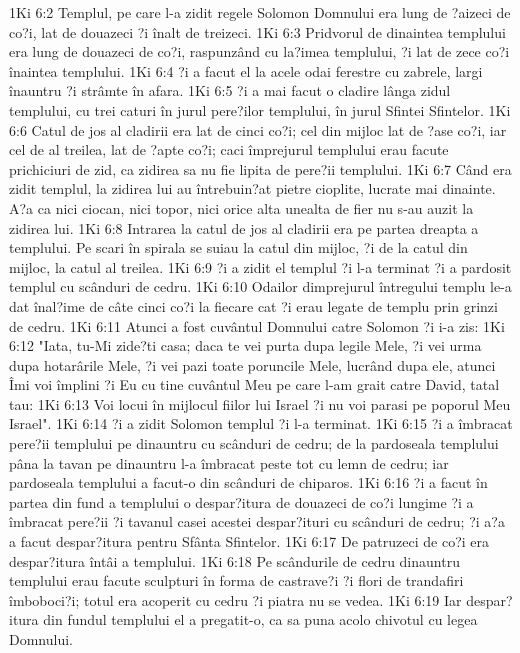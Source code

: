 1Ki 6:2  Templul, pe care l-a zidit regele Solomon Domnului era lung de ?aizeci de co?i, lat de douazeci ?i înalt de treizeci.
1Ki 6:3  Pridvorul de dinaintea templului era lung de douazeci de co?i, raspunzând cu la?imea templului, ?i lat de zece co?i înaintea templului.
1Ki 6:4  ?i a facut el la acele odai ferestre cu zabrele, largi înauntru ?i strâmte în afara.
1Ki 6:5  ?i a mai facut o cladire lânga zidul templului, cu trei caturi în jurul pere?ilor templului, în jurul Sfintei Sfintelor.
1Ki 6:6  Catul de jos al cladirii era lat de cinci co?i; cel din mijloc lat de ?ase co?i, iar cel de al treilea, lat de ?apte co?i; caci împrejurul templului erau facute prichiciuri de zid, ca zidirea sa nu fie lipita de pere?ii templului.
1Ki 6:7  Când era zidit templul, la zidirea lui au întrebuin?at pietre cioplite, lucrate mai dinainte. A?a ca nici ciocan, nici topor, nici orice alta unealta de fier nu s-au auzit la zidirea lui.
1Ki 6:8  Intrarea la catul de jos al cladirii era pe partea dreapta a templului. Pe scari în spirala se suiau la catul din mijloc, ?i de la catul din mijloc, la catul al treilea.
1Ki 6:9  ?i a zidit el templul ?i l-a terminat ?i a pardosit templul cu scânduri de cedru.
1Ki 6:10  Odailor dimprejurul întregului templu le-a dat înal?ime de câte cinci co?i la fiecare cat ?i erau legate de templu prin grinzi de cedru.
1Ki 6:11  Atunci a fost cuvântul Domnului catre Solomon ?i i-a zis:
1Ki 6:12  "Iata, tu-Mi zide?ti casa; daca te vei purta dupa legile Mele, ?i vei urma dupa hotarârile Mele, ?i vei pazi toate poruncile Mele, lucrând dupa ele, atunci Îmi voi împlini ?i Eu cu tine cuvântul Meu pe care l-am grait catre David, tatal tau:
1Ki 6:13  Voi locui în mijlocul fiilor lui Israel ?i nu voi parasi pe poporul Meu Israel".
1Ki 6:14  ?i a zidit Solomon templul ?i l-a terminat.
1Ki 6:15  ?i a îmbracat pere?ii templului pe dinauntru cu scânduri de cedru; de la pardoseala templului pâna la tavan pe dinauntru l-a îmbracat peste tot cu lemn de cedru; iar pardoseala templului a facut-o din scânduri de chiparos.
1Ki 6:16  ?i a facut în partea din fund a templului o despar?itura de douazeci de co?i lungime ?i a îmbracat pere?ii ?i tavanul casei acestei despar?ituri cu scânduri de cedru; ?i a?a a facut despar?itura pentru Sfânta Sfintelor.
1Ki 6:17  De patruzeci de co?i era despar?itura întâi a templului.
1Ki 6:18  Pe scândurile de cedru dinauntru templului erau facute sculpturi în forma de castrave?i ?i flori de trandafiri îmboboci?i; totul era acoperit cu cedru ?i piatra nu se vedea.
1Ki 6:19  Iar despar?itura din fundul templului el a pregatit-o, ca sa puna acolo chivotul cu legea Domnului.
